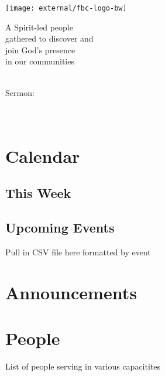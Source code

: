 \documentclass[
notumble,
nofoldmark,
letterpaper,
]{leaflet}
\date{\formatdate{#3}{#2}{#1}}%
\begin{document}
\begin{titlepage}
\centering
\vfill
{\centering
\texttt{[image: external/fbc-logo-bw]}\par}
\vfill
\large A Spirit-led people \\ gathered to discover and \\ join God's presence \\ in our communities
\vfill

\LARGE\sundaydate\\
\vfill
\large Sermon:\\
\LARGE\sermontitle\\
\LARGE\scripture\\

\vfill
\end{titlepage}

\thispagestyle{empty}

\section{\faCalendar \hspace{.5em} Calendar}
\subsection{This Week}


\subsection{Upcoming Events}

Pull in CSV file here formatted by event

\pagebreak

\section{Announcements}



\pagebreak

\section{People}

List of people serving in various capacitites

\pagebreak

\vfill


\end{document}
